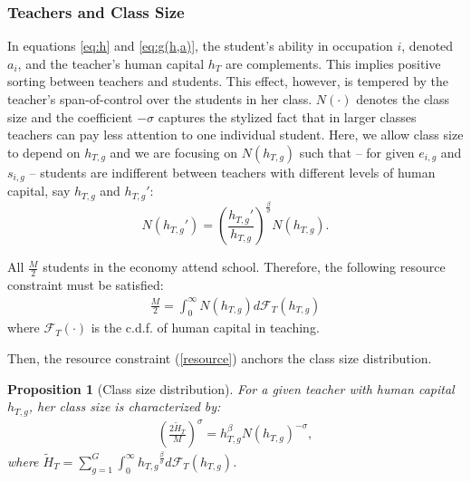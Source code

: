 \documentclass[onehalfspacing,11pt]{article}
\newtheorem{prp}{Proposition}
\begin{document}
	
	\subsubsection{Teachers and Class Size}
	In equations \eqref{eq:h} and \eqref{eq:g(h,a)}, the student's ability in occupation $i$, denoted $a_i$, and the teacher's human capital $h_T$ are complements. This implies positive sorting between teachers and students. This effect, however, is tempered by the teacher's span-of-control over the students in her class. $N(\cdot)$ denotes the class size and the coefficient $-\sigma$ captures the stylized fact that in larger classes teachers can pay less attention to one individual student. Here, we allow class size to depend on $h_{T,g}$ and we are focusing on $N(h_{T,g})$ such that -- for given $e_{i,g}$ and $s_{i,g}$ -- students are indifferent between teachers with different levels of human capital, say $h_{T,g}$ and ${h_{T,g}}'$:
	\begin{equation}
		\label{ }
		N({h_{T,g}}') = \left(\frac{{h_{T,g}}'}{{h_{T,g}}}\right)^{\frac{\beta}{\sigma}} N({h_{T,g}}).
	\end{equation}
	
	All $\frac{M}{2}$ students in the economy attend school. Therefore, the following resource constraint must be satisfied:
	\begin{align}
		\label{resource}
		\frac{M}{2}=\int_0^\infty N(h_{T,g})d\mathcal{F}_T(h_{T,g}) 
	\end{align}
	where $\mathcal{F}_T(\cdot)$ is the c.d.f. of human capital in teaching.
	
	Then, the resource constraint (\ref{resource}) anchors the class size distribution.
	\begin{prp}[Class size distribution] For a given teacher with human capital $h_{T,g}$, her class size is characterized by:
		\begin{align}
			\left(\frac{2\widetilde{H}_T}{M}\right)^\sigma=h_{T,g}^\beta N(h_{T,g})^{-\sigma},\label{eq:N(h)}
		\end{align}
		where $\widetilde{H}_T = \sum_{g=1}^G \int_0^\infty {h_{T,g}}^{\frac{\beta}{\sigma}} d\mathcal{F}_T(h_{T,g}) $.
	\end{prp}
	
\end{document}
